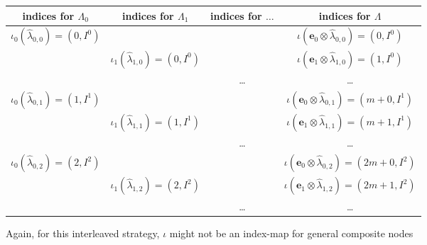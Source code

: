 \documentclass[a4paper,10pt,headings=normal,bibliography=totoc]{scrartcl}
\begin{document}
\begin{itemize}
    \begin{tabular}{c|c|c|c}
      indices for $\Lambda_0$ &
      indices for $\Lambda_1$ &
      indices for $\dots$ &
      indices for $\Lambda$ \\
      \hline
      $\iota_0(\hat{\lambda}_{0,0}) = (0,I^0)$ & & &
        $\iota(\mathbf{e}_0 \otimes \hat{\lambda}_{0,0}) = (0,I^0)$ \\
      & $\iota_1(\hat{\lambda}_{1,0}) = (0,I^0)$ & &
        $\iota(\mathbf{e}_1 \otimes \hat{\lambda}_{1,0}) = (1,I^0)$ \\
      & & \dots &
        \dots \\
      $\iota_0(\hat{\lambda}_{0,1}) = (1,I^1)$ & & &
        $\iota(\mathbf{e}_0 \otimes \hat{\lambda}_{0,1}) = (m+0,I^1)$ \\
      & $\iota_1(\hat{\lambda}_{1,1}) = (1,I^1)$ & &
        $\iota(\mathbf{e}_1 \otimes \hat{\lambda}_{1,1}) = (m+1,I^1)$ \\
      & & \dots &
        \dots \\
      $\iota_0(\hat{\lambda}_{0,2}) = (2,I^2)$ & & &
        $\iota(\mathbf{e}_0 \otimes \hat{\lambda}_{0,2}) = (2m+0,I^2)$ \\
      & $\iota_1(\hat{\lambda}_{1,2}) = (2,I^2)$ & &
        $\iota(\mathbf{e}_1 \otimes \hat{\lambda}_{1,2}) = (2m+1,I^2)$ \\
      & & \dots &
        \dots \\
    \end{tabular}

    Again, for this interleaved strategy, $\iota$ might not be an
    index-map for general composite nodes
\end{itemize}
\end{document}
